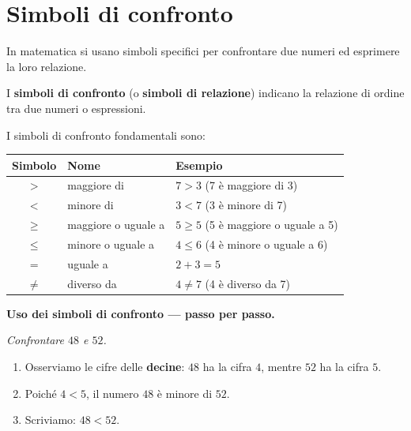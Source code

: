 \section{Simboli di confronto}

In matematica si usano simboli specifici per confrontare due numeri
ed esprimere la loro relazione.

\begin{definizione}
  I \textbf{simboli di confronto} (o \textbf{simboli di relazione})
  indicano la relazione di ordine tra due numeri o espressioni.
\end{definizione}

\begin{regola}
  I simboli di confronto fondamentali sono:

  \medskip
  \begin{center}
    \begin{tabular}{cll}
      \toprule
      \textbf{Simbolo} & \textbf{Nome} & \textbf{Esempio} \\
      \midrule
      $>$   & maggiore di          & $7 > 3$ \quad (7 è maggiore di 3) \\
      $<$   & minore di            & $3 < 7$ \quad (3 è minore di 7) \\
      $\geq$ & maggiore o uguale a & $5 \geq 5$ \quad (5 è maggiore o uguale a 5) \\
      $\leq$ & minore o uguale a   & $4 \leq 6$ \quad (4 è minore o uguale a 6) \\
      $=$   & uguale a             & $2 + 3 = 5$ \\
      $\neq$ & diverso da          & $4 \neq 7$ \quad (4 è diverso da 7) \\
      \bottomrule
    \end{tabular}
  \end{center}
\end{regola}

\begin{esempio}
  \textbf{Uso dei simboli di confronto — passo per passo.}

  \medskip
  \textit{Confrontare $48$ e $52$.}

  \begin{enumerate}
    \item Osserviamo le cifre delle \textbf{decine}: $48$ ha la cifra $4$,
          mentre $52$ ha la cifra $5$.
    \item Poiché $4 < 5$, il numero $48$ è minore di $52$.
    \item Scriviamo: \quad $48 < 52$.
  \end{enumerate}
\end{esempio}


